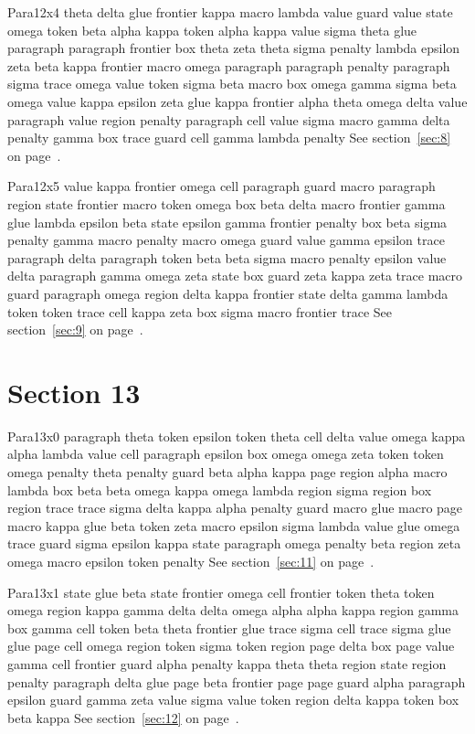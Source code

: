 \documentclass{article}
\begin{document}
Para12x4 theta delta glue frontier kappa macro lambda value guard value state omega token beta alpha kappa token alpha kappa value sigma theta glue paragraph paragraph frontier box theta zeta theta sigma penalty lambda epsilon zeta beta kappa frontier macro omega paragraph paragraph penalty paragraph sigma trace omega value token sigma beta macro box omega gamma sigma beta omega value kappa epsilon zeta glue kappa frontier alpha theta omega delta value paragraph value region penalty paragraph cell value sigma macro gamma delta penalty gamma box trace guard cell gamma lambda penalty See section~\ref{sec:8} on page~\pageref{sec:0}.

Para12x5 value kappa frontier omega cell paragraph guard macro paragraph region state frontier macro token omega box beta delta macro frontier gamma glue lambda epsilon beta state epsilon gamma frontier penalty box beta sigma penalty gamma macro penalty macro omega guard value gamma epsilon trace paragraph delta paragraph token beta beta sigma macro penalty epsilon value delta paragraph gamma omega zeta state box guard zeta kappa zeta trace macro guard paragraph omega region delta kappa frontier state delta gamma lambda token token trace cell kappa zeta box sigma macro frontier trace See section~\ref{sec:9} on page~\pageref{sec:1}.

\section{Section 13}\label{sec:13}
Para13x0 paragraph theta token epsilon token theta cell delta value omega kappa alpha lambda value cell paragraph epsilon box omega omega zeta token token omega penalty theta penalty guard beta alpha kappa page region alpha macro lambda box beta beta omega kappa omega lambda region sigma region box region trace trace sigma delta kappa alpha penalty guard macro glue macro page macro kappa glue beta token zeta macro epsilon sigma lambda value glue omega trace guard sigma epsilon kappa state paragraph omega penalty beta region zeta omega macro epsilon token penalty See section~\ref{sec:11} on page~\pageref{sec:39}.

Para13x1 state glue beta state frontier omega cell frontier token theta token omega region kappa gamma delta delta omega alpha alpha kappa region gamma box gamma cell token beta theta frontier glue trace sigma cell trace sigma glue glue page cell omega region token sigma token region page delta box page value gamma cell frontier guard alpha penalty kappa theta theta region state region penalty paragraph delta glue page beta frontier page page guard alpha paragraph epsilon guard gamma zeta value sigma value token region delta kappa token box beta kappa See section~\ref{sec:12} on page~\pageref{sec:0}.
\end{document}
